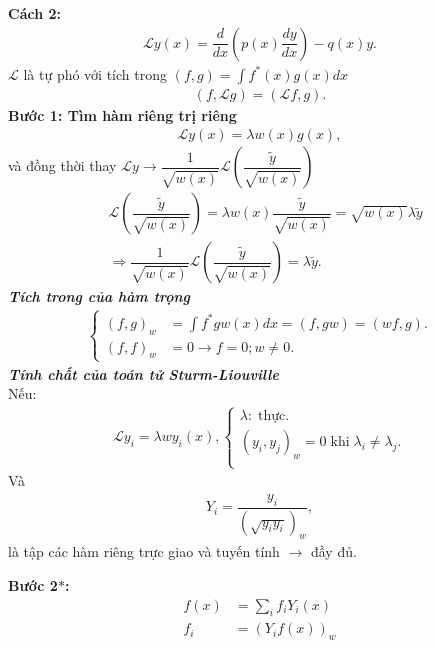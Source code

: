 \documentclass{report}
\newcommand{\s}{\ast}
\newcommand{\dps}{\displaystyle}
\newcommand{\f}[2]{\dfrac{#1}{#2}}
\begin{document}
\textbf{Cách 2:}
\begin{align*}
	\mathcal{L}y(x) = \f{d}{dx}\left(p(x)\f{dy}{dx}\right) - q(x)y.
\end{align*}
$\mathcal{L}$ là tự phó với tích trong $(f,g) = \dps\int f^{\s}(x) g(x) dx$
\begin{align*}
	\left(f,\mathcal{L}g\right) = \left(\mathcal{L}f,g\right).
\end{align*}
\textbf{Bước 1: Tìm hàm riêng trị riêng}
\begin{align*}
	\mathcal{L}y(x) = \lambda w(x)g(x),
\end{align*}
và đồng thời thay $\mathcal{L}y \rightarrow \f{1}{\sqrt{w(x)}} \mathcal{L}(\f{\tilde{y}}{\sqrt{w(x)}})$
\begin{align*}
	 & \mathcal{L}\left(\f{\tilde{y}}{\sqrt{w(x)}}\right) = \lambda w(x) \f{\tilde{y}}{\sqrt{w(x)}} = \sqrt{w(x)}\lambda\tilde{y} \\
	 & \Rightarrow \f{1}{\sqrt{w(x)}}\mathcal{L}\left(\f{\tilde{y}}{\sqrt{w(x)}}\right) = \lambda \tilde{y}.
\end{align*}
\textit{\textbf{Tích trong của hàm trọng}}
\begin{align*}
	\begin{cases}
		(f,g)_w & = \int f^{\s} g w(x)dx = (f,gw) = (wf,g) . \\
		(f,f)_w & = 0 \rightarrow f = 0;w \neq 0  .
	\end{cases}
\end{align*}
\textit{ \textbf{Tính chất của toán tử Sturm-Liouville}}\\
Nếu:
\begin{align*}
	\mathcal{L} y_i = \lambda w y_i(x),
	\begin{cases}
		\lambda:\;\text{thực}.                                             \\
		\left(y_i,y_j\right)_w = 0\;\text{khi}\; \lambda_i \neq \lambda_j. \\
	\end{cases}
\end{align*}
Và
\begin{align*}
	Y_i = \f{y_i}{(\sqrt{y_i y_i})_w},
\end{align*}
là tập các hàm riêng trực giao và tuyến tính $\rightarrow$ đầy đủ.

\textbf{Bước 2$\s$:}
\begin{align*}
	f(x) & = \sum_{i} f_i Y_i(x) \\
	f_i  & = (Y_i f(x))_w
\end{align*}
\end{document}
